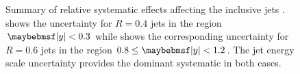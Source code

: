 \begin{figure}[htpb]
  \quad
  \caption{Summary of relative systematic effects affecting the inclusive jets \xs. \protect{} shows the uncertainty for \akt $R=0.4$ jets in the region $\absRap < 0.3$ while \protect{} shows the corresponding uncertainty for \akt $R=0.6$ jets in the region $0.8 \leq \absRap < 1.2$. The jet energy scale uncertainty provides the dominant systematic in both cases.}
  \label{fig:forward-inclusive:uncertainties}
\end{figure}

